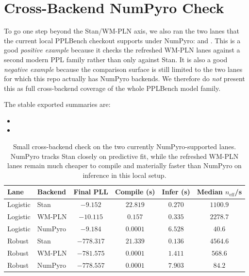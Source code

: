 \documentclass[11pt,openany]{report}
\begin{document}
\section{Cross-Backend NumPyro Check}
\label{app:pplbench-numpyro-crosscheck}

To go one step beyond the Stan/WM-PLN axis, we also ran the two lanes that the
current local PPLBench checkout supports under NumPyro:
 and .  This is a
good \emph{positive example} because it checks the refreshed WM-PLN lanes
against a second modern PPL family rather than only against Stan.  It is also a
good \emph{negative example} because the comparison surface is still limited to
the two lanes for which this repo actually has NumPyro backends.  We therefore
do \emph{not} present this as full cross-backend coverage of the whole
PPLBench model family.

The stable exported summaries are:
\begin{itemize}
\item {}
\item {}
\end{itemize}

\begin{table}[htbp]
\centering
\caption{Small cross-backend check on the two currently NumPyro-supported
lanes.  NumPyro tracks Stan closely on predictive fit, while the refreshed
WM-PLN lanes remain much cheaper to compile and materially faster than NumPyro
on inference in this local setup.}
\label{tab:pplbench-numpyro-crosscheck}
\small
\begin{tabular}{llcccc}
\toprule
Lane & Backend & Final PLL & Compile (s) & Infer (s) & Median $n_{\mathrm{eff}}$/s \\
\midrule
Logistic & Stan & $-9.152$ & $22.819$ & $0.270$ & $1100.9$ \\
Logistic & WM-PLN & $-10.115$ & $0.157$ & $0.335$ & $2278.7$ \\
Logistic & NumPyro & $-9.184$ & $0.0001$ & $6.528$ & $40.6$ \\
\midrule
Robust & Stan & $-778.317$ & $21.339$ & $0.136$ & $4564.6$ \\
Robust & WM-PLN & $-781.575$ & $0.0001$ & $1.411$ & $568.6$ \\
Robust & NumPyro & $-778.557$ & $0.0001$ & $7.903$ & $84.2$ \\
\bottomrule
\end{tabular}
\end{table}
\end{document}
